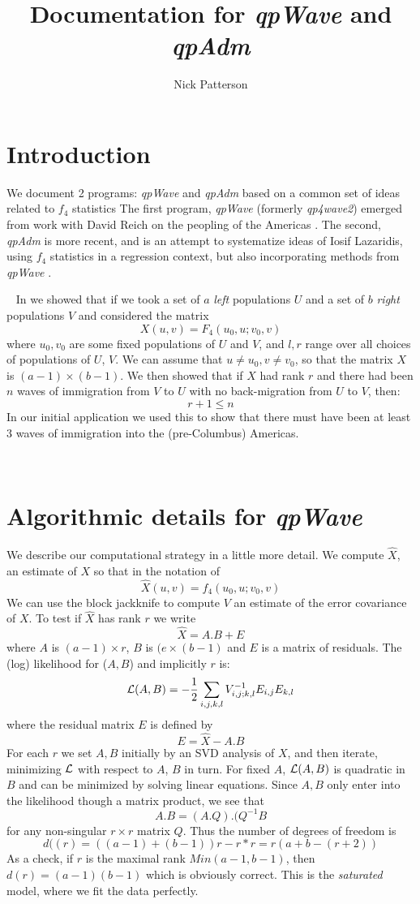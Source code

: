 \documentclass{article} %
\newcommand  {\cL}  {{\cal L}}
\newcommand  {\half}  {{\frac{1}{2}}}
\newcommand  {\nld }  {{\ \newline \noindent}}
\newcommand  {\qpw }  {{\em qpWave }}
\newcommand  {\qpa }  {{\em qpAdm }}
\begin{document}


\title{Documentation for {\em qpWave} and {\em qpAdm}} 
\author{Nick Patterson}
\maketitle
\section{Introduction} 
We document 2 programs: {\em qpWave} and {\em qpAdm} based on 
a common set of ideas related to $f_4$ statistics \cite{ancadm} 
The first program, \qpw (formerly {\em qp4wave2}) emerged from work with 
David Reich on the peopling of the Americas \cite{natam1}.
The second, \qpa is more recent, and is an attempt to systematize ideas 
of Iosif Lazaridis, using $f_4$ statistics in a regression context, but 
also incorporating methods from \qpw.

\nld
In \cite[S6]{natam1} we showed that if we took a set of $a$ {\em left} populations $U$ 
and a set of $b$ {\em right}  populations $V$ and considered the matrix 
\[
X(u, v) = F_4(u_0, u; v_0, v) 
\]
where $u_0, v_0$ are some fixed populations of $U$ and $V$, and 
$l, r$ range over all choices of populations of $U$, $V$.  
We can assume that $u \ne u_0, v \ne v_0$, so that the 
matrix $X$ is $ (a-1) \times (b-1) $.
We then showed that if $X$ had rank $r$ and there had been $n$ waves of immigration from $V$ to  $U$ 
with no back-migration from $U$ to $V$, 
then:     
\[ 
r + 1 \le n
\]
In our initial application we used this to show that there must have been at least 3 waves 
of immigration into the (pre-Columbus) Americas.  

\nld
\section{Algorithmic details for \qpw}
We describe our computational strategy in a little more detail.  
We compute $\hat X$,  an estimate of $X$ so that in the notation of \cite{ancadm} 
\[
\hat X(u, v) = f_4(u_0, u; v_0, v) 
\]
We can use the block jackknife \cite{blockjack1}
to compute $V$ an estimate of the error covariance of $X$.
To test if $\hat X$ has rank $r$ we write 
\[
\hat X = A . B  + E 
\]
where $A$ is $(a-1) \times r $, $B$ is $(e \times (b-1)$ and $E$ is a matrix of residuals.  
The (log) likelihood for ($A, B$) and implicitly $r$ is: 
\[
\cL(A, B) = -\half \sum_{i,j,k,l} 
V_{i,j; k,l}^{-1} 
E_{i,j} E_{k,l} 
\]
where the residual matrix $E$ is defined by 
\[
E = \hat X - A.B 
\]
For each $r$ we set $A, B$ initially by an SVD analysis of $X$, 
and then iterate, minimizing $\cL$ with respect to $A$, $B$ in turn. 
For fixed $A$, $\cL(A,B)$ is quadratic in $B$ and can be minimized by 
solving linear equations.
Since $A, B$ only enter into the likelihood though a matrix product, we 
see that 
\[
A.B = (A.Q) . (Q^{-1} B 
\]
for any non-singular $r \times r$ matrix $Q$.  
Thus the number of degrees of freedom is 
\[
d((r) = ((a-1) + (b-1) )r - r * r = r (a+b-(r+2)) 
\]
As a check, if $r$ is the maximal rank $Min(a-1, b-1)$, then 
$d(r) = (a-1)(b-1)$ which is obviously correct.  This is 
the {\em saturated} model, where we fit the data perfectly. 
\end{document}
